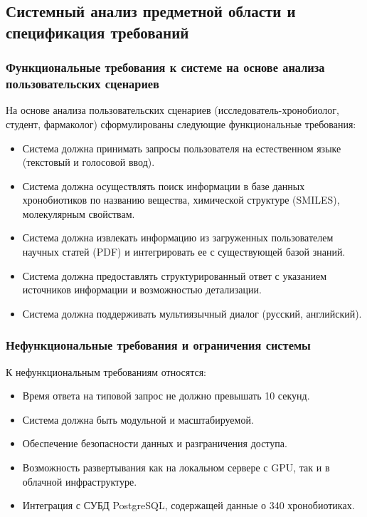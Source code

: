 \documentclass[a4paper,14pt]{extarticle}
\begin{document}
	\subsection{Системный анализ предметной области и спецификация требований}
	
	\subsubsection{Функциональные требования к системе на основе анализа пользовательских сценариев}
	На основе анализа пользовательских сценариев (исследователь-хронобиолог, студент, фармаколог) сформулированы следующие функциональные требования:
	\begin{itemize}
		\item Система должна принимать запросы пользователя на естественном языке (текстовый и голосовой ввод).
		\item Система должна осуществлять поиск информации в базе данных хронобиотиков по названию вещества, химической структуре (SMILES), молекулярным свойствам.
		\item Система должна извлекать информацию из загруженных пользователем научных статей (PDF) и интегрировать ее с существующей базой знаний.
		\item Система должна предоставлять структурированный ответ с указанием источников информации и возможностью детализации.
		\item Система должна поддерживать мультиязычный диалог (русский, английский).
	\end{itemize}
	
	\subsubsection{Нефункциональные требования и ограничения системы}
	К нефункциональным требованиям относятся:
	\begin{itemize}
		\item Время ответа на типовой запрос не должно превышать 10 секунд.
		\item Система должна быть модульной и масштабируемой.
		\item Обеспечение безопасности данных и разграничения доступа.
		\item Возможность развертывания как на локальном сервере с GPU, так и в облачной инфраструктуре.
		\item Интеграция с СУБД PostgreSQL, содержащей данные о 340 хронобиотиках.
	\end{itemize}
	
\end{document}
